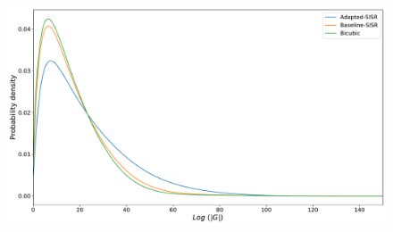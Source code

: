         \begin{figure}[H]
            \centering
            \includegraphics[scale=0.4]{Includes/5-gradient-histogram-validation-dataset.pdf}
            \caption{}
            \label{fig:5-gradient-histogram-validation-dataset}
        \end{figure}
        
        
    